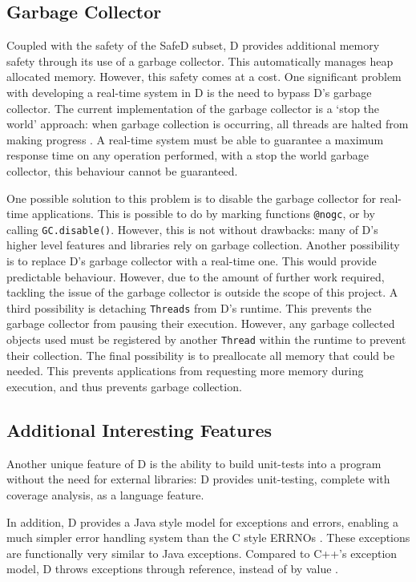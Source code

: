 \subsection{Garbage Collector}
Coupled with the safety of the SafeD subset, D provides additional memory
safety through its use of a garbage collector. This
automatically manages heap allocated memory. 
However, this safety comes at a cost. One significant problem with developing a 
real-time system in D is the need to bypass D's garbage collector. 
The current implementation of the garbage 
collector is a `stop the world' approach: when garbage collection is occurring, 
all threads are halted from making progress 
\cite{dlang-garbage}. A real-time system must be able
to guarantee a maximum response time on any operation performed,  
with a stop the world garbage collector, this behaviour cannot be guaranteed. 
\par\bigskip\noindent
One possible solution to this problem is to disable the garbage collector for 
real-time applications. This is possible to do by marking functions \texttt{@nogc}, 
or by calling \texttt{GC.disable()}. However, this is not without drawbacks: 
many of D's higher level features and libraries rely on garbage collection. 
Another possibility is to replace D's garbage collector with a real-time 
one. This would provide predictable behaviour. However, due to the amount of 
further work required, tackling the issue of the garbage collector is outside the 
scope of this project.
A third possibility is
detaching \texttt{Threads} from D's runtime. This prevents the garbage collector from
pausing their execution. However, any garbage collected objects used must be registered
by another \texttt{Thread} within the runtime to prevent their collection. 
The final possibility is to preallocate all memory that could be needed. This 
prevents applications from requesting more memory during execution, and 
thus prevents garbage collection. 

\subsection{Additional Interesting Features}
Another unique feature of D is the ability to build unit-tests into a 
program without the need for external libraries: D provides 
unit-testing, complete with coverage analysis, as a language feature. 
\par\bigskip\noindent
In addition, D provides a Java style model for exceptions and errors, enabling 
a much simpler error handling system than the C style ERRNOs 
\cite{ddili-book}. 
These exceptions are functionally very similar to Java exceptions. Compared to
C++'s exception model, D throws exceptions through reference, instead of by
value \cite{interface-to-cpp}. 

